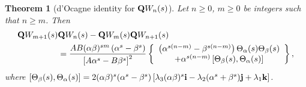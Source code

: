 \documentclass{kms-c}
\theoremstyle{plain}
\newtheorem{theorem}{Theorem}[section]
\theoremstyle{definition}
\theoremstyle{remark}
\begin{document}
\begin{theorem}[d'Ocagne identity for $\textnormal{\textbf{Q}}W_{n}(s)$]\label{t6}
Let $n\geq 0$, $m\geq 0$ be integers such that $n\geq m$. Then
\begin{align*}
\textnormal{\textbf{Q}}W_{m+1}(s)&\textnormal{\textbf{Q}}W_{n}(s)-\textnormal{\textbf{Q}}W_{m}(s)\textnormal{\textbf{Q}}W_{n+1}(s)\\
&=\frac{AB(\alpha\beta)^{sm}\left(\alpha^{s}-\beta^{s}\right)}{\left[A\alpha^{s}-B\beta^{s}\right]^{2}}\left\lbrace \begin{array}{c} 
\left(\alpha^{s(n-m)}-\beta^{s(n-m)}\right)\Theta_{\alpha}(s)\Theta_{\beta}(s)\\
+ \alpha^{s(n-m)}\left[\Theta_{\beta}(s),\Theta_{\alpha}(s)\right]
\end{array}\right\rbrace ,
\end{align*}
where $\left[\Theta_{\beta}(s),\Theta_{\alpha}(s)\right]=2(\alpha\beta)^{s}(\alpha^{s}-\beta^{s})\left[\lambda_{3}(\alpha\beta)^{s}\textnormal{\textbf{i}}-\lambda_{2}(\alpha^{s}+\beta^{s})\textnormal{\textbf{j}}+\lambda_{1}\textnormal{\textbf{k}}\right]$.
\end{theorem}
\end{document}
